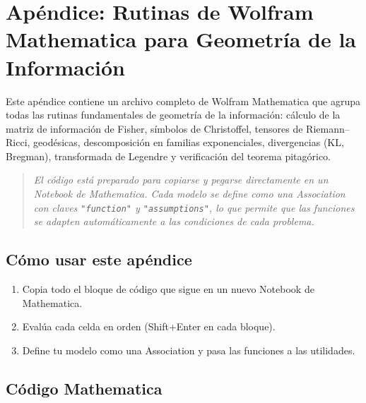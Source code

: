 
\chapter*{Apéndice: Rutinas de Wolfram Mathematica para Geometría de la Información}
\label{ap:mathematica}

Este apéndice contiene un archivo completo de Wolfram Mathematica que agrupa todas las rutinas fundamentales de geometría de la información: cálculo de la matriz de información de Fisher, símbolos de Christoffel, tensores de Riemann--Ricci, geodésicas, descomposición en familias exponenciales, divergencias (KL, Bregman), transformada de Legendre y verificación del teorema pitagórico.

\begin{quotation}
	\itshape
	El código está preparado para copiarse y pegarse directamente en un Notebook de Mathematica.  Cada modelo se define como una \emph{Association} con claves \texttt{"function"} y \texttt{"assumptions"}, lo que permite que las funciones se adapten automáticamente a las condiciones de cada problema.
\end{quotation}

\section{Cómo usar este apéndice}
\begin{enumerate}
	\item Copia todo el bloque de código que sigue en un nuevo Notebook de Mathematica.
	\item Evalúa cada celda en orden (Shift+Enter en cada bloque).
	\item Define tu modelo como una Association y pasa las funciones a las utilidades.
\end{enumerate}

\section{Código Mathematica}

